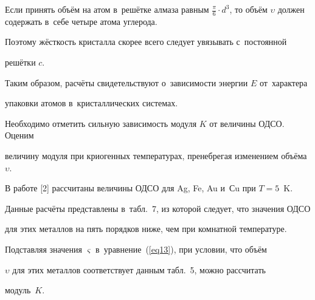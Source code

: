 Если принять объём на атом в~решётке алмаза равным $\frac{\pi }{6}\cdot 

d^3$, то объём $\upsilon $ должен содержать в~себе четыре атома углерода. 

Поэтому жёсткость кристалла скорее всего следует увязывать с~постоянной 

решётки $c$.



Таким образом, расчёты свидетельствуют о~зависимости энергии $E$ от~характера 

упаковки атомов в~кристаллических системах.



Необходимо отметить сильную зависимость модуля $K$ от величины \mbox{ОДСО}. Оценим 

величину модуля при криогенных температурах, пренебрегая изменением объёма~$\upsilon $.



В работе [2] рассчитаны величины ОДСО для Ag, Fe, Au и~Сu при \mbox{$T = 5$}~K. 

Данные расчёты представлены в~табл.~7, из которой следует, что значения ОДСО 

для этих металлов на пять порядков ниже, чем при комнатной температуре. 

Подставляя значения $\varsigma $ в~уравнение~(\ref{eq13}), при условии, что объём 

$\upsilon $ для этих металлов соответствует данным табл.~5, можно рассчитать 

модуль~$K$.



\vspace{-3mm}

